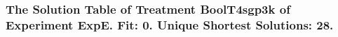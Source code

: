  \begin{frame}
 \fontsize{8pt}{9pt}\selectfont
 \frametitle{ The Solution Table of Treatment BoolT4sgp3k of Experiment ExpE. Fit: 0. Unique Shortest Solutions: 28. }

 \label{ExpESolutionTable001.tex}  
 \end{frame}

